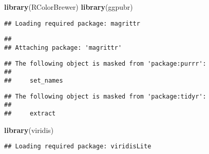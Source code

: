 \documentclass[]{article}
\newenvironment{Shaded}{\begin{snugshade}}{\end{snugshade}}
\newcommand{\KeywordTok}[1]{\textcolor[rgb]{0.13,0.29,0.53}{\textbf{#1}}}
\newcommand{\StringTok}[1]{\textcolor[rgb]{0.31,0.60,0.02}{#1}}
\newcommand{\CommentTok}[1]{\textcolor[rgb]{0.56,0.35,0.01}{\textit{#1}}}
\newcommand{\OperatorTok}[1]{\textcolor[rgb]{0.81,0.36,0.00}{\textbf{#1}}}
\newcommand{\NormalTok}[1]{#1}
\begin{document}
\begin{Shaded}
\begin{Highlighting}[]
\KeywordTok{library}\NormalTok{(RColorBrewer)}
\KeywordTok{library}\NormalTok{(ggpubr)}
\end{Highlighting}
\end{Shaded}

\begin{verbatim}
## Loading required package: magrittr
\end{verbatim}

\begin{verbatim}
## 
## Attaching package: 'magrittr'
\end{verbatim}

\begin{verbatim}
## The following object is masked from 'package:purrr':
## 
##     set_names
\end{verbatim}

\begin{verbatim}
## The following object is masked from 'package:tidyr':
## 
##     extract
\end{verbatim}

\begin{Shaded}
\begin{Highlighting}[]
\KeywordTok{library}\NormalTok{(viridis)}
\end{Highlighting}
\end{Shaded}

\begin{verbatim}
## Loading required package: viridisLite
\end{verbatim}

\begin{Shaded}
\end{Shaded}
\end{document}
